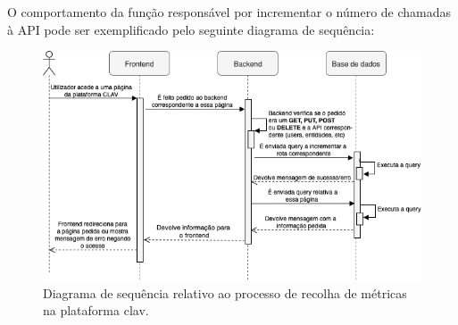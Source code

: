O comportamento da função responsável por incrementar o número de chamadas à API pode ser exemplificado pelo seguinte diagrama de sequência:

\begin{figure}[H]
    \centering
    \includegraphics[width=\textwidth]{img/diagramas/sequencia/DiagramasSequencia-Metrica.png}
    \caption{Diagrama de sequência relativo ao processo de recolha de métricas na plataforma \gls{clav}.}
    \label{fig:diagramaSequenciaMetrica}
\end{figure}